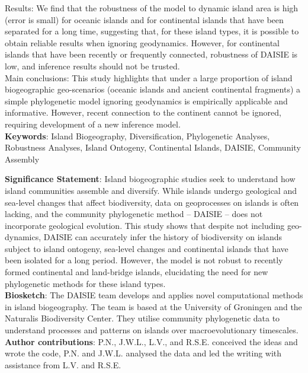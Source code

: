 \documentclass{article}
\begin{document}
\noindent Results: We find that the robustness of the model to dynamic island area is high (error is small) for oceanic islands and for continental islands that have been separated for a long time, suggesting that, for these island types, it is possible to obtain reliable results when ignoring geodynamics. However, for continental islands that have been recently or frequently connected, robustness of DAISIE is low, and inference results should not be trusted. \\

\noindent Main conclusions: This study highlights that under a large proportion of island biogeographic geo-scenarios (oceanic islands and ancient continental fragments) a simple phylogenetic model ignoring geodynamics is empirically applicable and informative. However, recent connection to the continent cannot be ignored, requiring development of a new inference model. \\

\noindent \textbf{Keywords}: Island Biogeography, Diversification, Phylogenetic Analyses, Robustness Analyses, Island Ontogeny, Continental Islands, DAISIE, Community Assembly \\

\clearpage

\noindent \textbf{Significance Statement}: Island biogeographic studies seek to understand how island communities assemble and diversify. While islands undergo geological and sea-level changes that affect biodiversity, data on geoprocesses on islands is often lacking, and the community phylogenetic method – DAISIE – does not incorporate geological evolution. This study shows that despite not including geo-dynamics, DAISIE can accurately infer the history of biodiversity on islands subject to island ontogeny, sea-level changes and continental islands that have been isolated for a long period. However, the model is not robust to recently formed continental and land-bridge islands, elucidating the need for new phylogenetic methods for these island types. \\

\noindent \textbf{Biosketch}: The DAISIE team develops and applies novel computational methods in island biogeography. The team is based at the University of Groningen and the Naturalis Biodiversity Center. They utilise community phylogenetic data to understand processes and patterns on islands over macroevolutionary timescales. \\

\noindent \textbf{Author contributions}: P.N., J.W.L., L.V., and R.S.E. conceived the ideas and wrote the code, P.N. and J.W.L. analysed the data and led the writing with assistance from L.V. and R.S.E. \\
\end{document}
